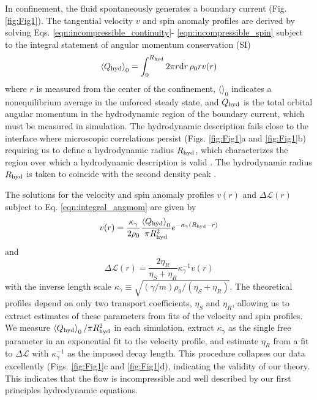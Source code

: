 \documentclass[%
 reprint,
superscriptaddress,
longbibliography,
 amsmath,amssymb,
 prl,
 citeautoscript,
]{revtex4-1}
\begin{document}
In confinement, the fluid spontaneously generates a boundary current (Fig. \ref{fig:Fig1}). The tangential velocity $v$ and spin anomaly profiles are derived by solving Eqs. \ref{eqn:incompressible_continuity}- \ref{eqn:incompressible_spin} subject to the integral statement of angular momentum conservation (SI)
\begin{equation}
\left\langle Q_{\rm hyd} \right\rangle_0 = \int_0^{R_{\rm hyd}} 2 \pi r {\rm d} r \, \rho_0 r v(r)
\label{eqn:integral_angmom}
\end{equation}
where $r$ is measured from the center of the confinement, $\langle \rangle_0$ indicates a nonequilibrium average in the unforced steady state, and $Q_{\rm hyd}$ is the total orbital angular momentum in the hydrodynamic region of the boundary current, which must be measured in simulation. The hydrodynamic description fails close to the interface where microscopic correlations persist (Figs. \ref{fig:Fig1}a and \ref{fig:Fig1}b) requiring us to define a hydrodynamic radius $R_{\rm hyd}$, which characterizes the region over which a hydrodynamic description is valid \cite{Bocquet_Barrat1994}. The hydrodynamic radius $R_{\rm hyd}$ is taken to coincide with the second density peak \cite{Chen_interface,my_JPCL}.

The solutions for the velocity and spin anomaly profiles $v(r)$ and $\Delta \mathcal{L}(r)$ subject to Eq. \ref{eqn:integral_angmom} are given by
\begin{equation}
v(r) = \frac{\kappa_{\gamma}}{2 \rho_0} \frac{\left\langle Q_{\rm hyd} \right\rangle_0}{\pi R_{\rm hyd}^2} e^{-\kappa_{\gamma} \left( R_{\rm hyd} - r \right)}
\label{eqn:v_BC}
\end{equation}
and
\begin{equation}
\Delta \mathcal{L} (r) = \frac{2 \eta_R}{\eta_S + \eta_R} \kappa_{\gamma}^{-1} v(r)
\label{eqn:DL_BC}
\end{equation}
with the inverse length scale $\kappa_{\gamma} \equiv \sqrt{(\gamma/m) \rho_0 / \left(\eta_S + \eta_R\right)}$. The theoretical profiles depend on only two transport coefficients, $\eta_S$ and $\eta_R$, allowing us to extract estimates of these parameters from fits of the velocity and spin profiles. We measure $\left\langle Q_{\rm hyd} \right\rangle_0 / \pi R_{\rm hyd}^2$ in each simulation, extract $\kappa_{\gamma}$ as the single free parameter in an exponential fit to the velocity profile, and estimate $\eta_R$ from a fit to $\Delta \mathcal{L}$ with $\kappa_{\gamma}^{-1}$ as the imposed decay length. This procedure collapses our data excellently (Figs. \ref{fig:Fig1}c and \ref{fig:Fig1}d), indicating the validity of our theory. This indicates that the flow is incompressible and well described by our first principles hydrodynamic equations.
\end{document}
